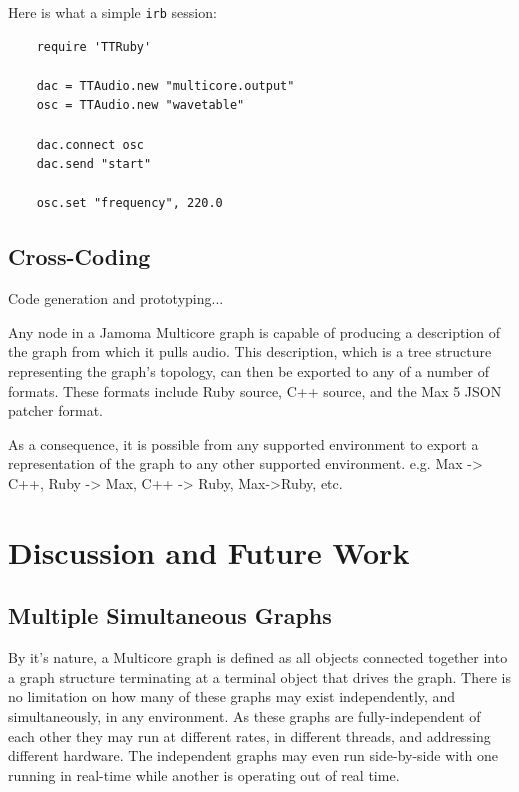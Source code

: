 \documentclass[twoside,a4paper]{article}
\begin{document}
Here is what a simple \texttt{irb} session:

\begin{lstlisting}
	require 'TTRuby'
	
 	dac = TTAudio.new "multicore.output"
 	osc = TTAudio.new "wavetable"

	dac.connect osc
	dac.send "start"
	
	osc.set "frequency", 220.0
\end{lstlisting}




\subsection{Cross-Coding} %


Code generation and prototyping...

Any node in a Jamoma Multicore graph is capable of producing a description of the graph from which it pulls audio.  This description, which is a tree structure representing the graph's topology, can then be exported to any of a number of formats.  These formats include Ruby source, C++ source, and the Max 5 JSON patcher format.

As a consequence, it is possible from any supported environment to export a representation of the graph to any other supported environment.  e.g. Max -> C++, Ruby -> Max, C++ -> Ruby, Max->Ruby, etc.






\section{Discussion and Future Work} %

\subsection{Multiple Simultaneous Graphs} %

By it's nature, a Multicore graph is defined as all objects connected together into a graph structure terminating at a terminal object that drives the graph.  There is no limitation on how many of these graphs may exist independently, and simultaneously, in any environment.  As these graphs are fully-independent of each other they may run at different rates, in different threads, and addressing different hardware.  The independent graphs may even run side-by-side with one running in real-time while another is operating out of real time.
\end{document}
